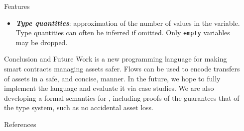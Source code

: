 \documentclass[usenames, dvipsnames, final]{beamer}
\newlength{\sepwidth}
\newlength{\colwidth}
\newcommand{\separatorcolumn}{\begin{column}{\sepwidth}\end{column}}
\newcommand{\term}[1]{\textbf{\emph{#1}}}
\begin{document}
\begin{frame}[t]
\begin{columns}[t]
\begin{column}{\colwidth}
\begin{alertblock}{Features}
\begin{itemize}
            \item \term{Type quantities}: approximation of the number of values in the variable.
                Type quantities can often be inferred if omitted.
                Only \lstinline[language=flow,basicstyle=\normalsize\ttfamily]{empty} \assetTxt variables may be dropped.
        \end{itemize}
    \end{alertblock}

    \begin{block}{Conclusion and Future Work}
        \langName is a new programming language for making smart contracts managing assets safer.
        Flows can be used to encode transfers of assets in a safe, and concise, manner.
        In the future, we hope to fully implement the \langName language and evaluate it via case studies.
        We are also developing a formal semantics for \langName, including proofs of the guarantees that of the type system, such as no accidental asset loss.
    \end{block}

    \begin{block}{References}
        \nocite{*}
        \scriptsize{}
    \end{block}

\end{column}

\separatorcolumn
\end{columns}
\end{frame}
\end{document}
